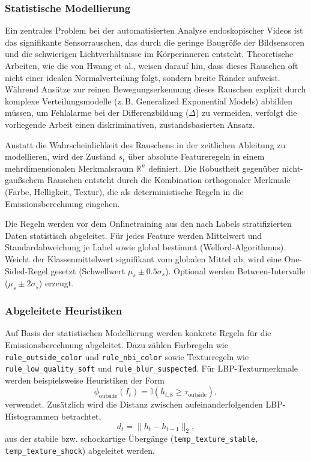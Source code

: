 \subsubsection{Statistische Modellierung}
Ein zentrales Problem bei der automatisierten Analyse endoskopischer Videos ist das signifikante Sensorrauschen, das durch die geringe Baugröße der Bildsensoren und die schwierigen Lichtverhältnisse im Körperinneren entsteht. Theoretische Arbeiten, wie die von Hwang et al., weisen darauf hin, dass dieses Rauschen oft nicht einer idealen Normalverteilung folgt, sondern breite Ränder aufweist. Während Ansätze zur reinen Bewegungserkennung dieses Rauschen explizit durch komplexe Verteilungsmodelle (z.\,B. Generalized Exponential Models) abbilden müssen, um Fehlalarme bei der Differenzbildung ($\Delta$) zu vermeiden, verfolgt die vorliegende Arbeit einen diskriminativen, zustandsbasierten Ansatz. \cite{hwang2008generalized}

Anstatt die Wahrscheinlichkeit des Rauschens in der zeitlichen Ableitung zu modellieren, wird der Zustand $s_t$ über absolute Featureregeln in einem mehrdimensionalen Merkmalsraum $\mathbb{R}^n$ definiert. Die Robustheit gegenüber nicht-gaußschem Rauschen entsteht durch die Kombination orthogonaler Merkmale (Farbe, Helligkeit, Textur), die als deterministische Regeln in die Emissionsberechnung eingehen.

Die Regeln werden vor dem Onlinetraining aus den nach Labels stratifizierten Daten statistisch abgeleitet. Für jedes Feature werden Mittelwert und Standardabweichung je Label sowie global bestimmt (Welford-Algorithmus). Weicht der Klassenmittelwert signifikant vom globalen Mittel ab, wird eine One-Sided-Regel gesetzt (Schwellwert $\mu_s \pm 0.5\sigma_s$). Optional werden Between-Intervalle (\(\mu_s \pm 2\sigma_s\)) erzeugt.

\subsubsection{Abgeleitete Heuristiken}
Auf Basis der statistischen Modellierung werden konkrete Regeln für die Emissionsberechnung abgeleitet. Dazu zählen Farbregeln wie \texttt{rule\_outside\_color} und \texttt{rule\_nbi\_color} sowie Texturregeln wie \texttt{rule\_low\_quality\_soft} und \texttt{rule\_blur\_suspected}. Für LBP-Texturmerkmale werden beispielsweise Heuristiken der Form
\begin{equation}
    \phi_{\text{outside}}(I_t) = \mathbb{I}(h_{t,8} \ge \tau_{\text{outside}}),
\end{equation}
verwendet. Zusätzlich wird die Distanz zwischen aufeinanderfolgenden LBP-Histogrammen betrachtet,
\begin{equation}
    d_t = \lVert h_t - h_{t-1} \rVert_2,
\end{equation}
aus der stabile bzw. schockartige Übergänge (\texttt{temp\_texture\_stable}, \texttt{temp\_texture\_shock}) abgeleitet werden.


